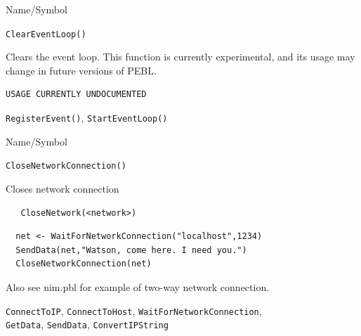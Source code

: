 \begin{desc}{Name/Symbol}
\item[Name/Symbol]  	\verb+ClearEventLoop()+ 

\item[Description]  Clears the event loop.  This function is currently experimental, and its usage may change in future versions of PEBL.

\item[Usage]       	
\begin{verbatim}
USAGE CURRENTLY UNDOCUMENTED
\end{verbatim}

\item[Example]	

\item[See Also] 
\verb+RegisterEvent()+, \verb+StartEventLoop()+
\end{desc}





\begin{desc}{Name/Symbol}
\item[Name/Symbol]	\verb+CloseNetworkConnection()+

\item[Description]	Closes network connection

\item[Usage]
\begin{verbatim}
   CloseNetwork(<network>)
\end{verbatim}

\item[Example]	

\begin{verbatim}
  net <- WaitForNetworkConnection("localhost",1234)
  SendData(net,"Watson, come here. I need you.")
  CloseNetworkConnection(net)
\end{verbatim}
Also see nim.pbl for example of two-way network connection.
\item[See Also]
  \verb+ConnectToIP+, \verb+ConnectToHost+,  \verb+WaitForNetworkConnection+, \\
  \verb+GetData+,  \verb+SendData+, \verb+ConvertIPString+
\end{desc}





